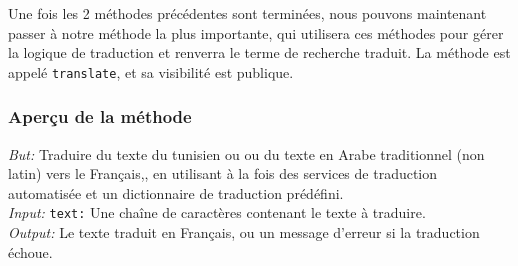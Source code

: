 \newpage
\noindent
Une fois les 2 méthodes précédentes sont terminées, nous pouvons maintenant passer à notre méthode la plus importante, qui utilisera ces méthodes pour gérer la logique de traduction et renverra le terme de recherche traduit. La méthode est appelé \texttt{translate}, et sa visibilité est publique.

\subsubsection{Aperçu de la méthode}
\noindent
\textit{But:} Traduire du texte du tunisien ou ou du texte en Arabe traditionnel (non latin) vers le Français,, en utilisant à la fois des services de traduction automatisée et un dictionnaire de traduction prédéfini. \\
\textit{Input:} \texttt{text:} Une chaîne de caractères contenant le texte à traduire. \\
\textit{Output:} Le texte traduit en Français, ou un message d'erreur si la traduction échoue.

\newpage
